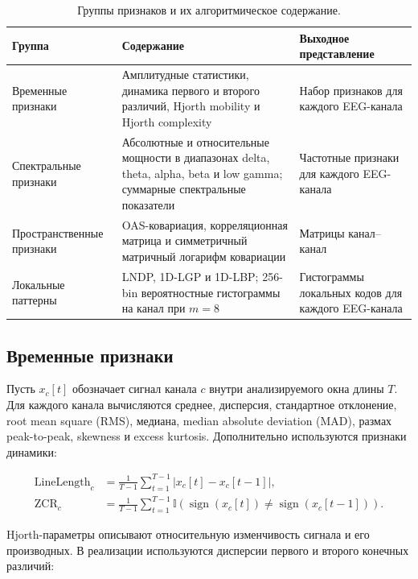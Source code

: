 \begin{table}[!t]
  \centering
  \small
  \setlength{\tabcolsep}{3pt}
  \renewcommand{\arraystretch}{1.15}
  \caption{Группы признаков и их алгоритмическое содержание.}
  \label{tab:feature-implementation-anchors}
  \begin{tabularx}{\textwidth}{|L{34mm}|L{48mm}|Y|}
    \hline
    Группа & Содержание & Выходное представление \\
    \hline
    Временные признаки & Амплитудные статистики, динамика первого и второго
    различий, Hjorth mobility и Hjorth complexity &
    Набор признаков для каждого EEG-канала \\
    \hline
    Спектральные признаки & Абсолютные и относительные мощности в диапазонах
    delta, theta, alpha, beta и low gamma; суммарные спектральные показатели &
    Частотные признаки для каждого EEG-канала \\
    \hline
    Пространственные признаки & OAS-ковариация, корреляционная матрица и
    симметричный матричный логарифм ковариации &
    Матрицы канал--канал \\
    \hline
    Локальные паттерны & LNDP, 1D-LGP и 1D-LBP; 256-bin вероятностные
    гистограммы на канал при $m=8$ &
    Гистограммы локальных кодов для каждого EEG-канала \\
    \hline
  \end{tabularx}
\end{table}

\subsection*{Временные признаки}

Пусть $x_c[t]$ обозначает сигнал канала $c$ внутри анализируемого окна длины
$T$. Для каждого канала вычисляются среднее, дисперсия, стандартное
отклонение, root mean square (RMS), медиана, median absolute deviation (MAD),
размах peak-to-peak, skewness и excess kurtosis. Дополнительно используются
признаки динамики:

\begin{align}
\operatorname{LineLength}_c &=
\frac{1}{T - 1}\sum_{t=1}^{T-1}|x_c[t] - x_c[t-1]|, \\
\operatorname{ZCR}_c &=
\frac{1}{T - 1}\sum_{t=1}^{T-1}
\mathbb{I}\left(\operatorname{sign}(x_c[t]) \ne
\operatorname{sign}(x_c[t-1])\right).
\end{align}

Hjorth-параметры описывают относительную изменчивость сигнала и его
производных. В реализации используются дисперсии первого и второго конечных
различий:

